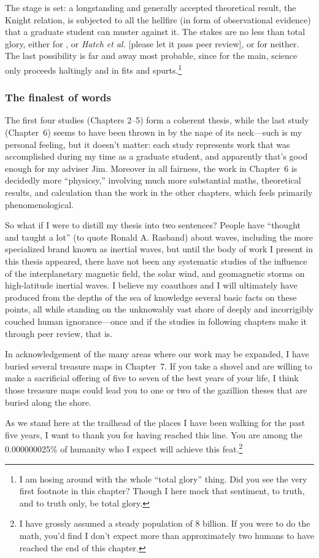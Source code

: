 The stage is set: a longstanding and generally accepted theoretical result, the
Knight relation, is subjected to all the hellfire (in form of observational
evidence) that a graduate student can muster against it. The stakes are no less
than total glory, either for \citet{Knight1973}, or \textit{Hatch et al.}
[please let it pass peer review], or for neither. The last possibility is far
and away most probable, since for the main, science only proceeds haltingly and
in fits and spurts.\footnote{I am hosing around with the whole ``total glory''
  thing. Did you see the very first footnote in this chapter? Though I here mock
  that sentiment, to truth, and to truth only, be total glory.}

\subsubsection{The finalest of words}

The first four studies (Chapters 2--5) form a coherent thesis, while the last
study (Chapter~6) seems to have been thrown in by the nape of its neck---such is
my personal feeling, but it doesn't matter: each study represents work that was
accomplished during my time as a graduate student, and apparently that's good
enough for my adviser Jim. Moreover in all fairness, the work in Chapter~6 is
decidedly more ``physicsy,'' involving much more substantial maths, theoretical
results, and calculation than the work in the other chapters, which feels
primarily phenomenological.

So what if I were to distill my thesis into two sentences? People have ``thought
and taught a lot'' (to quote Ronald A. Rasband) about \Alf waves, including the
more specialized brand known as inertial \Alf waves, but until the body of work
I present in this thesis appeared, there have not been any systematic studies of
the influence of the interplanetary magnetic field, the solar wind, and
geomagnetic storms on high-latitude inertial \Alf waves. I believe my coauthors
and I will ultimately have produced from the depths of the sea of knowledge
several basic facts on these points, all while standing on the unknowably vast
shore of deeply and incorrigibly couched human ignorance---once and if the
studies in following chapters make it through peer review, that is.

In acknowledgement of the many areas where our work may be expanded, I have
buried several treasure maps in Chapter~7. If you take a shovel and are willing
to make a sacrificial offering of five to seven of the best years of your life,
I think those treasure maps could lead you to one or two of the gazillion theses
that are buried along the shore.

As we stand here at the trailhead of the places I have been walking for the past
five years, I want to thank you for having reached this line. You are among the
0.000000025\% of humanity who I expect will achieve this feat.\footnote{I have
  grossly assumed a steady population of 8 billion. If you were to do the math,
  you'd find I don't expect more than approximately two humans to have reached
  the end of this chapter.}



